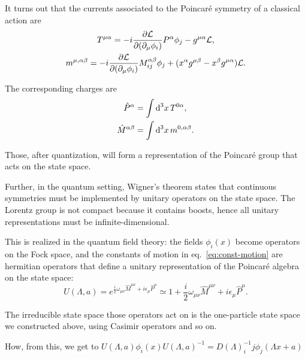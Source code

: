 It turns out that the currents associated to the Poincaré symmetry of a classical action are
\begin{subequations}
\begin{gather}
T^{\mu\alpha} = -i \frac{\partial \mathcal{L}}{\partial(\partial_\mu \phi_i)} P^\alpha \phi_j - g^{\mu\alpha} \mathcal{L} , \\
m^{\mu,\alpha\beta} = -i \frac{\partial \mathcal{L}}{\partial (\partial_\mu \phi_i)} M^{\alpha\beta}_{ij} \phi_j + (x^\alpha g^{\mu\beta} - x^\beta g^{\mu\alpha}) \mathcal{L} .
\end{gather}
\end{subequations}

The corresponding charges are
\begin{subequations}\label{eq:const-motion}
\begin{align}
    \hat{P}^\alpha &= \int {\mathop{}\!\mathrm{d}}^3 x \, T^{0\alpha} , \\
   \hat{M}^{\alpha\beta} &= \int {\mathop{}\!\mathrm{d}}^3 x \, m^{0 ,\alpha\beta} .
\end{align}
\end{subequations}

Those, after quantization, will form a representation of the Poincaré group that acts on the state space.

Further, in the quantum setting, Wigner's theorem states that continuous symmetries must be implemented by unitary operators on the state space. The Lorentz group is not compact because it contains boosts, hence all unitary representations must be infinite-dimensional. 

This is realized in the quantum field theory: the fields $\phi_i(x)$ become operators on the Fock space, and the constants of motion in eq.~\eqref{eq:const-motion} are hermitian operators that define a unitary representation of the Poincaré algebra on the state space:
\begin{equation}
    U(\Lambda,a) = e^{\frac{i}{2} \omega_{\mu\nu} \hat{M}^{\mu\nu} + i \epsilon_\mu \hat{P}^\mu} \simeq 1 + \frac{i}{2} \omega_{\mu\nu} \hat{M}^{\mu\nu} + i \epsilon_\mu \hat{P}^\mu .
\end{equation}

The irreducible state space those operators act on is the one-particle state space we constructed above, using Casimir operators and so on.

\color{red} How, from this, we get to $U(\Lambda,a) \phi_i(x) U(\Lambda,a)^{-1} = D(\Lambda)^{-1}_ij \phi_j (\Lambda x + a)$
\color{black}

